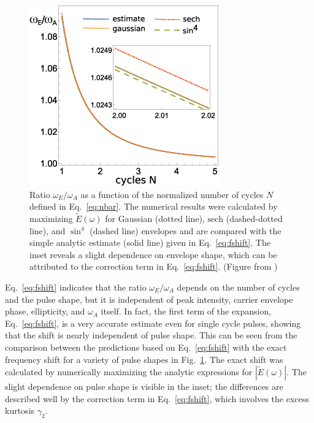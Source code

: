 \begin{figure}[!ht]
\centering
    \includegraphics[width=0.5\linewidth]{figs/Frequency_shift/fshift51.png}
\caption{Ratio $\omega_E/\omega_A$ as a function of the normalized number of cycles $ N$ defined in Eq.~\ref{eq:nbar}. The numerical results were calculated by maximizing $\tilde{E}(\omega)$ for Gaussian (dotted line), $\text{sech}$ (dashed-dotted line), and $\sin^4$ (dashed line) envelopes and are compared with the simple analytic estimate (solid line) given in Eq.~\ref{eq:fshift}. The inset reveals a slight dependence on envelope shape, which can be attributed to the correction term in Eq.~\ref{eq:fshift}. (Figure from \cite{venzke2018_Central})
}
  \label{fig:shift}
\end{figure}

Eq.~\ref{eq:fshift} indicates that the ratio $\omega_E/\omega_A$ depends on the number of cycles and the pulse shape, but it is independent of peak intensity, carrier envelope phase, ellipticity, and $\omega_A$ itself. In fact, the first term of the expansion, Eq.~\ref{eq:fshift}, is a very accurate estimate even for single cycle pulses, showing that the shift is nearly independent of pulse shape. This can be seen from the comparison between the predictions based on Eq.~\ref{eq:fshift} with the exact frequency shift for a variety of pulse shapes in Fig.~\ref{fig:shift}. The exact shift was calculated by numerically maximizing the analytic expressions for $|\tilde{E}(\omega)|$. The slight dependence on pulse shape is visible in the inset; the differences are described well by the correction term in Eq.~\ref{eq:fshift}, which involves the excess kurtosis $\gamma_2$.

